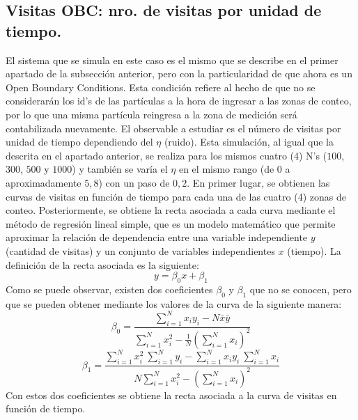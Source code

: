 \documentclass[11pt]{article}
\begin{document}
    \subsection{Visitas OBC: nro. de visitas por unidad de tiempo.}
            El sistema que se simula en este caso es el mismo que se describe en el primer apartado de la subsección
            anterior, pero con la particularidad de que ahora es un Open Boundary Conditions. Esta condición refiere
            al hecho de que no se considerarán los id's de las partículas a la hora de ingresar a las zonas de conteo,
            por lo que una misma partícula reingresa a la zona de medición será contabilizada nuevamente.
            El observable a estudiar es el número de visitas por unidad de tiempo dependiendo del $\eta$ (ruido).
            Esta simulación, al igual que la descrita en el apartado anterior, se realiza para los mismos cuatro (4) N's
            ($100$, $300$, $500$ y $1000$) y también se varía el $\eta$ en el mismo rango (de $0$ a aproximadamente $5,8$)
            con un paso de $0,2$.
            En primer lugar, se obtienen las curvas de visitas en función de tiempo para cada una de las cuatro (4) zonas de conteo.
            Posteriormente, se obtiene la recta asociada a cada curva mediante el método de regresión lineal simple, que es un modelo matemático
            que permite aproximar la relación de dependencia entre una variable independiente $y$ (cantidad de visitas) y un
            conjunto de variables independientes $x$ (tiempo). La definición de la recta asociada es la siguiente:
            \begin{equation}
                y = \beta_0 x + \beta_1
            \end{equation}
            Como se puede observar, existen dos coeficientes $\beta_0$ y $\beta_1$ que no se conocen, pero que se pueden obtener mediante
            los valores de la curva de la siguiente manera:
            \begin{equation}
                \beta_0 = \frac{\sum_{i=1}^N x_i y_i - N\bar{x} \bar{y}}{\sum_{i=1}^N x_i^2 - \frac{1}{N} \left(\sum_{i=1}^N x_i \right)^2}
            \end{equation}
            \begin{equation}
                \beta_1 = \frac{\sum_{i=1}^N x_i^2 \ \sum_{i=1}^N y_i - \sum_{i=1}^N x_i y_i\ \sum_{i=1}^N x_i}{N\sum_{i=1}^N x_i^2 - \left(\sum_{i=1}^N x_i \right)^2}
            \end{equation}
            Con estos dos coeficientes se obtiene la recta asociada a la curva de visitas en función de tiempo.\newline
\end{document}
